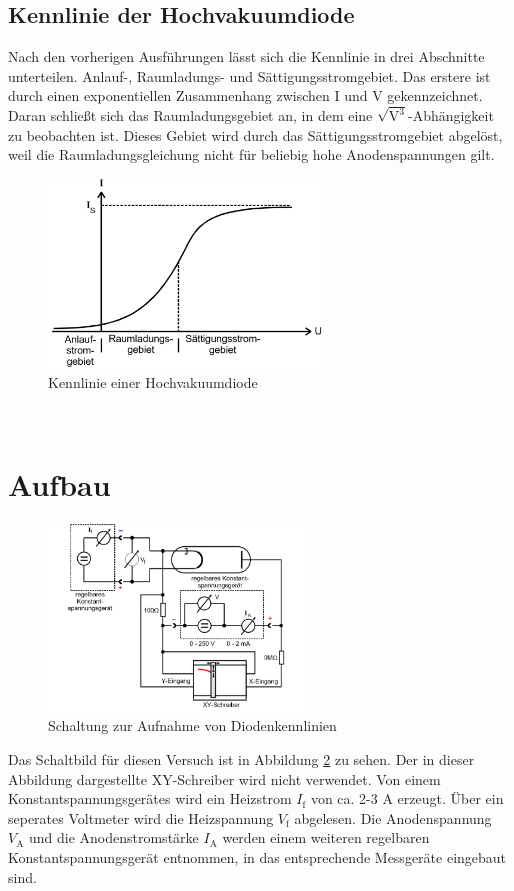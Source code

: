 \subsection{Kennlinie der Hochvakuumdiode}
Nach den vorherigen Ausführungen lässt sich die Kennlinie in drei Abschnitte unterteilen.
Anlauf-, Raumladungs- und Sättigungsstromgebiet.
Das erstere ist durch einen exponentiellen Zusammenhang zwischen I und V gekennzeichnet.
Daran schließt sich das Raumladungsgebiet an, in dem eine $\sqrt{\text{V}^3}$-Abhängigkeit zu beobachten ist.
Dieses Gebiet wird durch das Sättigungsstromgebiet abgelöst, weil die Raumladungsgleichung nicht für beliebig hohe Anodenspannungen gilt.
\begin{figure}
    \centering
    \includegraphics[height=5.0cm]{data/abb6.jpg}
    \caption{Kennlinie einer Hochvakuumdiode \cite{V504}}
    \label{fig:abb6}
\end{figure} \\
\noindent

\section{Aufbau}
\begin{figure}
    \centering
    \includegraphics[height=5.0cm]{data/abb7.jpg}
    \caption{Schaltung zur Aufnahme von Diodenkennlinien \cite{V504}}
    \label{fig:abb7}
\end{figure}
Das Schaltbild für diesen Versuch ist in Abbildung \ref{fig:abb7} zu sehen.
Der in dieser Abbildung dargestellte XY-Schreiber wird nicht verwendet.
Von einem Konstantspannungsgerätes wird ein Heizstrom $I_\text{f}$ von ca. 2-3 A erzeugt.
Über ein seperates Voltmeter wird die Heizspannung $V_\text{f}$ abgelesen.
Die Anodenspannung $V_\text{A}$ und die Anodenstromstärke $I_\text{A}$ werden einem weiteren regelbaren Konstantspannungsgerät entnommen, in das entsprechende Messgeräte eingebaut sind.
